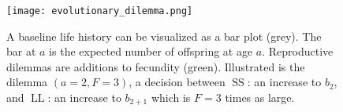 \documentclass[titlepage, hidelinks, 12pt]{article}
\theoremstyle{plain}
\theoremstyle{remark}
\theoremstyle{definition}
\DeclareMathOperator{\smallersooner}{SS}
\DeclareMathOperator{\largerlater}{LL}
\begin{document}
\begin{figure}[H]
    \centering
    \texttt{[image: evolutionary\_dilemma.png]}
    \caption[Baseline life history and reproductive dilemma example.]{A baseline life history can be visualized as a bar plot (grey). 
        The bar at $a$ is the expected number of offspring at age $a$. Reproductive dilemmas are additions to fecundity (green). 
        Illustrated is the dilemma $(a = 2, F = 3)$, a decision between $\smallersooner$: an increase to $b_2$, and $\largerlater$: an increase
        to $b_{2 + 1}$ which is $F = 3$ times as large.} 
        \label{fig:evolutionary_dilemma}
\end{figure}

%
%
%
%
\end{document}
